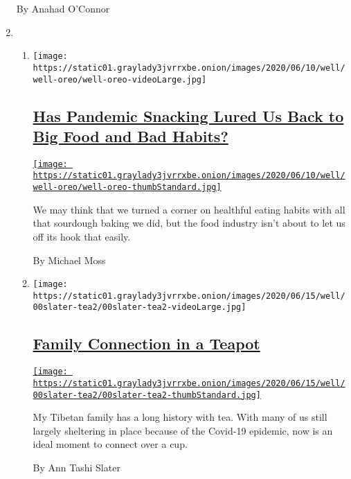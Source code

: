 \begin{enumerate}
  By Anahad O'Connor
\item
  \begin{enumerate}
  \def\labelenumii{\arabic{enumii}.}
  \item
    \texttt{[image: https://static01.graylady3jvrrxbe.onion/images/2020/06/10/well/well-oreo/well-oreo-videoLarge.jpg]}

    \hypertarget{has-pandemic-snacking-lured-us-back-to-big-food-and-bad-habits}{%
    \subsection{\texorpdfstring{\href{/2020/06/16/well/eat/pandemic-snacking-junk-food-habits-eating-weight.html}{Has
    Pandemic Snacking Lured Us Back to Big Food and Bad
    Habits?}}{Has Pandemic Snacking Lured Us Back to Big Food and Bad Habits?}}\label{has-pandemic-snacking-lured-us-back-to-big-food-and-bad-habits}}

    \href{/2020/06/16/well/eat/pandemic-snacking-junk-food-habits-eating-weight.html}{\texttt{[image: https://static01.graylady3jvrrxbe.onion/images/2020/06/10/well/well-oreo/well-oreo-thumbStandard.jpg]}}

    We may think that we turned a corner on healthful eating habits with
    all that sourdough baking we did, but the food industry isn't about
    to let us off its hook that easily.

    By Michael Moss
  \item
    \texttt{[image: https://static01.graylady3jvrrxbe.onion/images/2020/06/15/well/00slater-tea2/00slater-tea2-videoLarge.jpg]}

    \hypertarget{family-connection-in-a-teapot}{%
    \subsection{\texorpdfstring{\href{/2020/06/23/well/family/family-connection-in-a-teapot.html}{Family
    Connection in a
    Teapot}}{Family Connection in a Teapot}}\label{family-connection-in-a-teapot}}

    \href{/2020/06/23/well/family/family-connection-in-a-teapot.html}{\texttt{[image: https://static01.graylady3jvrrxbe.onion/images/2020/06/15/well/00slater-tea2/00slater-tea2-thumbStandard.jpg]}}

    My Tibetan family has a long history with tea. With many of us still
    largely sheltering in place because of the Covid-19 epidemic, now is
    an ideal moment to connect over a cup.

    By Ann Tashi Slater
  \end{enumerate}
\end{enumerate}

